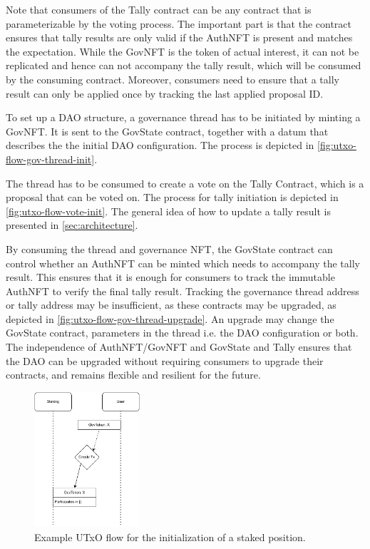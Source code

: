 \documentclass[11pt]{article}
\begin{document}
Note that consumers of the Tally contract can be any contract that is parameterizable by the voting process.
The important part is that the contract ensures that tally results are only valid if the AuthNFT is present and matches the expectation.
While the GovNFT is the token of actual interest, it can not be replicated and hence can not accompany the tally result, which will be consumed by the consuming contract.
Moreover, consumers need to ensure that a tally result can only be applied once by tracking the last applied proposal ID.

To set up a DAO structure, a governance thread has to be initiated by minting a GovNFT.
It is sent to the GovState contract, together with a datum that describes the the initial DAO configuration.
The process is depicted in \cref{fig:utxo-flow-gov-thread-init}.

The thread has to be consumed to create a vote on the Tally Contract, which is a proposal that can be voted on.
The process for tally initiation is depicted in \cref{fig:utxo-flow-vote-init}.
The general idea of how to update a tally result is presented in \cref{sec:architecture}.

By consuming the thread and governance NFT, the GovState contract can control whether an AuthNFT can be minted which needs to accompany the tally result. 
This ensures that it is enough for consumers to track the immutable AuthNFT to verify the final tally result.
Tracking the governance thread address or tally address may be insufficient,
as these contracts may be upgraded, as depicted in \cref{fig:utxo-flow-gov-thread-upgrade}.
An upgrade may change the GovState contract, parameters in the thread i.e. the DAO configuration or both.
The independence of AuthNFT/GovNFT and GovState and Tally ensures that the DAO can be upgraded without requiring consumers to upgrade their contracts,
and remains flexible and resilient for the future.

\begin{figure}
    \centering
    \includegraphics[width=0.35\textwidth]{figures/gov-init-stake.pdf}
    \caption{Example UTxO flow for the initialization of a staked position.}
    \label{fig:utxo-flow-gov-stake-init}
\end{figure}
\end{document}
